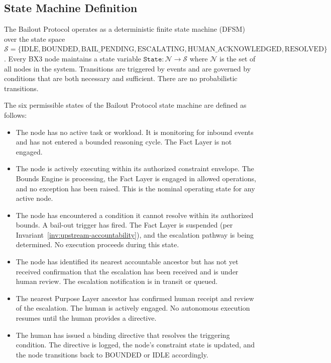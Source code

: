 \subsection{State Machine Definition}

The Bailout Protocol operates as a deterministic finite state machine (DFSM) over the state space $\mathcal{S} = \{\text{IDLE}, \text{BOUNDED}, \text{BAIL\_PENDING}, \text{ESCALATING}, \text{HUMAN\_ACKNOWLEDGED}, \text{RESOLVED}\}$. Every BX3 node maintains a state variable $\texttt{State}: \mathcal{N} \rightarrow \mathcal{S}$ where $\mathcal{N}$ is the set of all nodes in the system. Transitions are triggered by events and are governed by conditions that are both necessary and sufficient. There are no probabilistic transitions.

\begin{definition}
\label{def:bailout-state-space}
The six permissible states of the Bailout Protocol state machine are defined as follows:

\begin{itemize}[noitemsep]
    \item[\textbf{IDLE:}] The node has no active task or workload. It is monitoring for inbound events and has not entered a bounded reasoning cycle. The Fact Layer is not engaged.
    \item[\textbf{BOUNDED:}] The node is actively executing within its authorized constraint envelope. The Bounds Engine is processing, the Fact Layer is engaged in allowed operations, and no exception has been raised. This is the nominal operating state for any active node.
    \item[\textbf{BAIL\_PENDING:}] The node has encountered a condition it cannot resolve within its authorized bounds. A bail-out trigger has fired. The Fact Layer is suspended (per Invariant~\ref{inv:upstream-accountability}), and the escalation pathway is being determined. No execution proceeds during this state.
    \item[\textbf{ESCALATING:}] The node has identified its nearest accountable ancestor but has not yet received confirmation that the escalation has been received and is under human review. The escalation notification is in transit or queued.
    \item[\textbf{HUMAN\_ACKNOWLEDGED:}] The nearest Purpose Layer ancestor has confirmed human receipt and review of the escalation. The human is actively engaged. No autonomous execution resumes until the human provides a directive.
    \item[\textbf{RESOLVED:}] The human has issued a binding directive that resolves the triggering condition. The directive is logged, the node's constraint state is updated, and the node transitions back to BOUNDED or IDLE accordingly.
\end{itemize}
\end{definition}

